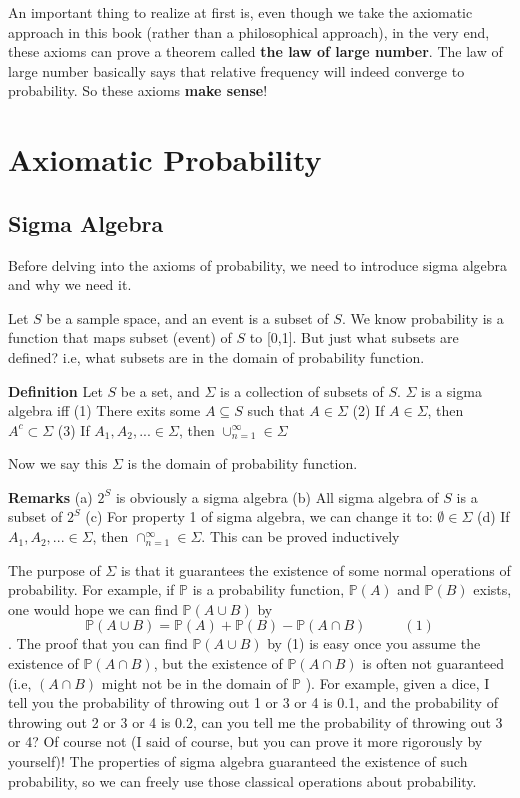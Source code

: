 \documentclass[a4paper,12pt]{article}
\begin{document}
An important thing to realize at first is, even though we take the axiomatic approach in this book (rather than a philosophical approach), in the very end, these axioms can prove a theorem called \textbf{the law of large number}. The law of large number basically says that relative frequency will indeed converge to probability. So these axioms \textbf{make sense}!

\newpage
\section{Axiomatic Probability}
\subsection{Sigma Algebra}
Before delving into the axioms of probability, we need to introduce sigma algebra and why we need it. 

Let $S$ be a sample space, and an event is a subset of $S$. We know probability is a function that maps subset (event) of $S$ to [0,1]. But just what subsets are defined? i.e, what subsets are in the domain of probability function. 

\textbf{Definition} Let $S$ be a set, and $\Sigma$ is a collection of subsets of $S$.  $\Sigma$ is a sigma algebra  iff 
(1) There exits some $A \subseteq S$ such that $A\in\Sigma$ 
(2) If $A \in \Sigma$, then $A^c \subset \Sigma$ 
(3) If $A_1, A_2, ... \in \Sigma$, then $\cup_{n=1}^\infty \in \Sigma$ 

Now we say this $\Sigma$ is the domain of probability function. 

\textbf{Remarks} 
(a) $2^S$ is obviously a sigma algebra 
(b) All sigma algebra of $S$ is a subset of $2^S$ 
(c) For property 1 of sigma algebra, we can change it to: $\emptyset \in \Sigma$ 
(d) If $A_1, A_2, ... \in \Sigma$, then $\cap_{n=1}^\infty \in \Sigma$. This can be proved inductively 

The purpose of $\Sigma$ is that it guarantees the existence of some normal operations of probability. For example, if $\mathbb{P}$ is a probability function, $\mathbb{P}(A)$ and $\mathbb{P}(B)$ exists, one would hope we can find $\mathbb{P}(A \cup B)$ by 
$$\mathbb{P}(A \cup B) = \mathbb{P}(A) +  \mathbb{P}(B) - \mathbb{P}(A \cap B) \ \ \ \ \ \ \ \ \ \ \ \ (1)$$
. The proof that you can find $\mathbb{P}(A \cup B)$ by (1) is easy once you assume the existence of $\mathbb{P}(A \cap B)$, but the existence of $\mathbb{P}(A \cap B)$ is often not guaranteed (i.e, $(A \cap B)$ might not be in the domain of $\mathbb{P}$ ). For example, given a dice, I tell you the probability of throwing out 1 or 3 or 4 is 0.1, and  the probability of throwing out 2 or 3 or 4 is 0.2, can you tell me the probability of throwing out 3 or 4? Of course not (I said of course, but you can prove it more rigorously by yourself)! The properties of sigma algebra guaranteed the existence of such probability, so we can freely use those classical operations about probability.
\end{document}
